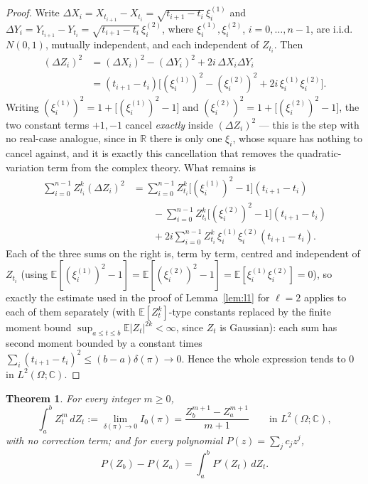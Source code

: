 \documentclass[11pt,fleqn]{article}
\def\C{\mathbb C}
\def\R{\mathbb R}
\def\E{\mathbb E}
\theoremstyle{plain}
\newtheorem{thm}{Theorem}[section]
\theoremstyle{remark}
\begin{document}
\begin{proof}
Write $\Delta X_i=X_{t_{i+1}}-X_{t_i}=\sqrt{t_{i+1}-t_i}\,\xi_i^{(1)}$ and
$\Delta Y_i=Y_{t_{i+1}}-Y_{t_i}=\sqrt{t_{i+1}-t_i}\,\xi_i^{(2)}$, where
$\xi_i^{(1)},\xi_i^{(2)}$, $i=0,\ldots,n-1$, are i.i.d.\ $N(0,1)$, mutually
independent, and each independent of $Z_{t_i}$. Then
\begin{align*}
(\Delta Z_i)^2&=(\Delta X_i)^2-(\Delta Y_i)^2+2i\,\Delta X_i\Delta Y_i\\
&=(t_{i+1}-t_i)\Big[(\xi_i^{(1)})^2-(\xi_i^{(2)})^2+2i\,\xi_i^{(1)}\xi_i^{(2)}\Big].
\end{align*}
Writing $(\xi_i^{(1)})^2=1+\big[(\xi_i^{(1)})^2-1\big]$ and
$(\xi_i^{(2)})^2=1+\big[(\xi_i^{(2)})^2-1\big]$, the two constant terms
$+1,-1$ cancel \emph{exactly} inside $(\Delta Z_i)^2$ — this is the step
with no real-case analogue, since in $\R$ there is only one $\xi_i$, whose
square has nothing to cancel against, and it is exactly this cancellation
that removes the quadratic-variation term from the complex theory. What
remains is
\begin{align*}
\sum_{i=0}^{n-1} Z_{t_i}^k(\Delta Z_i)^2
&=\sum_{i=0}^{n-1} Z_{t_i}^k\big[(\xi_i^{(1)})^2-1\big](t_{i+1}-t_i)\\
&\qquad-\sum_{i=0}^{n-1} Z_{t_i}^k\big[(\xi_i^{(2)})^2-1\big](t_{i+1}-t_i)\\
&\qquad+2i\sum_{i=0}^{n-1} Z_{t_i}^k\,\xi_i^{(1)}\xi_i^{(2)}(t_{i+1}-t_i).
\end{align*}
Each of the three sums on the right is, term by term, centred and
independent of $Z_{t_i}$ (using $\E[(\xi_i^{(1)})^2-1]=\E[(\xi_i^{(2)})^2-1]
=\E[\xi_i^{(1)}\xi_i^{(2)}]=0$), so exactly the estimate used in the proof
of Lemma~\ref{lem:l1} for $\ell=2$ applies to each of them separately
(with $\E[Z_t^k]$-type constants replaced by the finite moment bound
$\sup_{a\le t\le b}\E|Z_t|^{2k}<\infty$, since $Z_t$ is Gaussian): each
sum has second moment bounded by a constant times
$\sum_i(t_{i+1}-t_i)^2\le(b-a)\delta(\pi)\to0$. Hence the whole expression
tends to $0$ in $L^2(\Omega;\C)$.
\end{proof}

\begin{thm}\label{thm:complexIto}
For every integer $m\ge0$,
\[
\int_a^b Z_t^m\,dZ_t:=\lim_{\delta(\pi)\to0}I_0(\pi)=
\frac{Z_b^{m+1}-Z_a^{m+1}}{m+1}\qquad\text{in }L^2(\Omega;\C),
\]
with \emph{no} correction term; and for every polynomial
$P(z)=\sum_j c_jz^j$,
\[
P(Z_b)-P(Z_a)=\int_a^b P'(Z_t)\,dZ_t.
\]
\end{thm}
\end{document}
